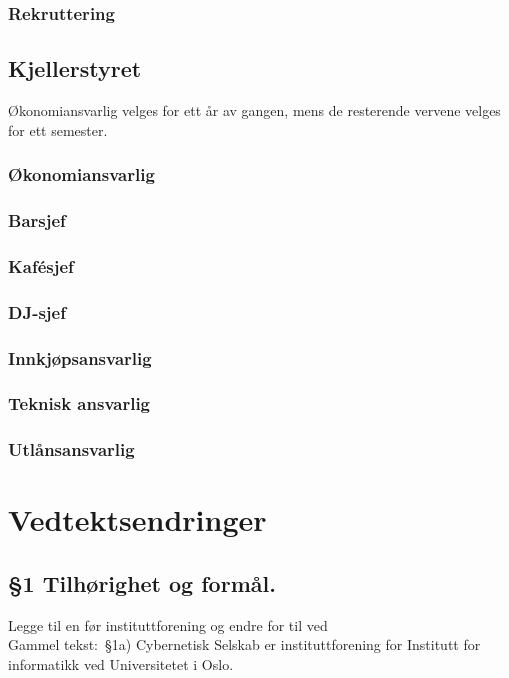 \documentclass[16pt,norsk,a4paper]{article}
\begin{document}
\subsubsection{Rekruttering}

\subsection{Kjellerstyret}
Økonomiansvarlig velges for ett år av gangen, mens de resterende vervene velges for ett semester.
\subsubsection{Økonomiansvarlig}

\subsubsection{Barsjef}

\subsubsection{Kafésjef}

\subsubsection{DJ-sjef}

\subsubsection{Innkjøpsansvarlig}

\subsubsection{Teknisk ansvarlig}

\subsubsection{Utlånsansvarlig}


\section{Vedtektsendringer}

\subsection{§1 Tilhørighet og formål.}
Legge til en før instituttforening og endre for til ved\\
Gammel tekst:\
§1a) Cybernetisk Selskab er instituttforening for Institutt for informatikk ved Universitetet i Oslo.\\
\end{document}
